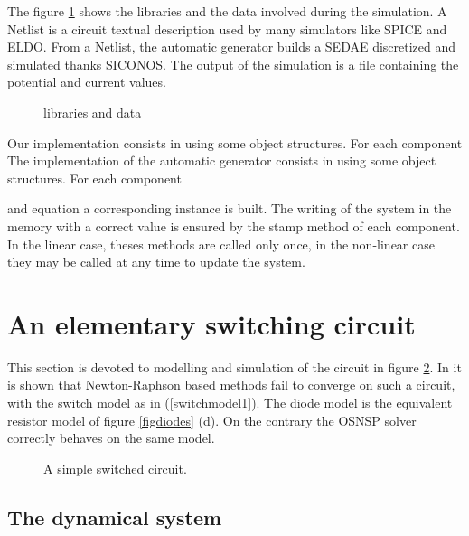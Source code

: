 The figure \ref{fig-soft-aspect} shows the libraries and the data involved during the simulation. A
Netlist is a circuit textual description used by many simulators like SPICE and ELDO. From a Netlist, the automatic generator builds a SEDAE discretized and simulated thanks
SICONOS. The output of the simulation is a file containing the potential and current values.

\begin{figure}[h]
\centerline{
 \scalebox{0.9}{
    
 }
}
\caption{libraries and data}
\label{fig-soft-aspect}
\end{figure}



Our implementation consists in using some object structures. For each component
The implementation of the automatic generator consists in using some object structures. For each component

and equation a corresponding instance is built. The writing of the system in the memory with a correct value is ensured by the stamp method of each component. In the linear
case, theses methods are called only once, in the non-linear case they may be called at any time to update the system.



\section{An elementary switching circuit}
\label{section3}


This section is devoted to modelling and simulation of the circuit in figure \ref{fig:figcircuit1}. In \cite{maffezzoni2006} it is shown that Newton-Raphson based methods fail to converge on such a circuit, with the switch model as in (\ref{switchmodel1}). The diode model is the equivalent resistor model of figure \ref{figdiodes} (d). On the contrary the OSNSP solver correctly behaves on the same model.  

\begin{figure}[h]
  \centering
   \scalebox{0.9}{
  
  }
  \caption{A simple switched circuit.}
  \label{fig:figcircuit1}
\end{figure}

\subsection{The dynamical system}
\label{section31}

